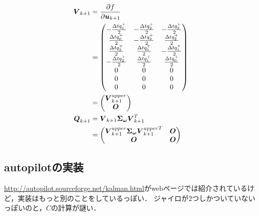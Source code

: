 \begin{align}
  \boldsymbol{V}_{k+1} &= \frac{\partial f}{\partial \boldsymbol{u}_{k+1}}\\
  &=
  \begin{pmatrix}
    -\frac{\Delta t q_{1}^{+}}{2} & -\frac{\Delta t q_{2}^{+}}{2} & -\frac{\Delta t q_{3}^{+}}{2}\\
     \frac{\Delta t q_{0}^{+}}{2} & -\frac{\Delta t q_{3}^{+}}{2} &  \frac{\Delta t q_{2}^{+}}{2}\\
     \frac{\Delta t q_{3}^{+}}{2} &  \frac{\Delta t q_{0}^{+}}{2} & -\frac{\Delta t q_{1}^{+}}{2}\\
    -\frac{\Delta t q_{2}^{+}}{2} &  \frac{\Delta t q_{1}^{+}}{2} &  \frac{\Delta t q_{0}^{+}}{2}\\
    0 & 0 & 0\\
    0 & 0 & 0\\
    0 & 0 & 0
  \end{pmatrix}\\
  &=
  \begin{pmatrix}
    \boldsymbol{V}_{k+1}^{upper}\\
    \boldsymbol{O}
  \end{pmatrix}\\
  \boldsymbol{Q}_{k+1}
  &=
  \boldsymbol{V}_{k+1}
  \boldsymbol{\Sigma}_{\boldsymbol{\omega}}
  \boldsymbol{V}_{k+1}^{T}\\
  &=
  \begin{pmatrix}
    \boldsymbol{V}_{k+1}^{upper} \boldsymbol{\Sigma}_{\boldsymbol{\omega}} {\boldsymbol{V}_{k+1}^{upper}}^{T} & \boldsymbol{O}\\
    \boldsymbol{O} & \boldsymbol{O}
  \end{pmatrix}
\end{align}

\subsection{autopilotの実装}
\url{http://autopilot.sourceforge.net/kalman.html}がwebページでは紹介されているけど，実装はもっと別のことをしているっぽい．
ジャイロが2つしかついていないっぽいのと，$C$の計算が謎い．

